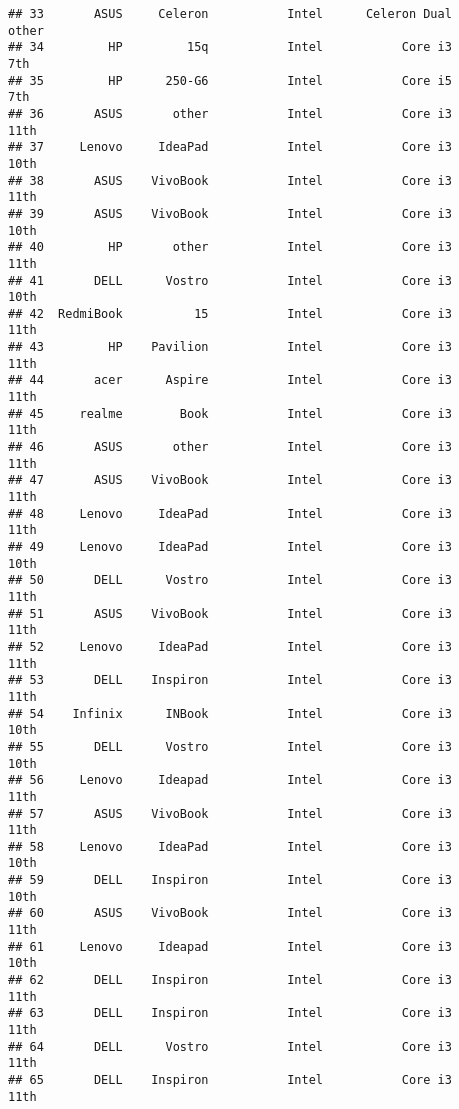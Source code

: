 \documentclass[
]{article}
\begin{document}
\begin{verbatim}
## 33       ASUS     Celeron           Intel      Celeron Dual           other
## 34         HP         15q           Intel           Core i3             7th
## 35         HP      250-G6           Intel           Core i5             7th
## 36       ASUS       other           Intel           Core i3            11th
## 37     Lenovo     IdeaPad           Intel           Core i3            10th
## 38       ASUS    VivoBook           Intel           Core i3            11th
## 39       ASUS    VivoBook           Intel           Core i3            10th
## 40         HP       other           Intel           Core i3            11th
## 41       DELL      Vostro           Intel           Core i3            10th
## 42  RedmiBook          15           Intel           Core i3            11th
## 43         HP    Pavilion           Intel           Core i3            11th
## 44       acer      Aspire           Intel           Core i3            11th
## 45     realme        Book           Intel           Core i3            11th
## 46       ASUS       other           Intel           Core i3            11th
## 47       ASUS    VivoBook           Intel           Core i3            11th
## 48     Lenovo     IdeaPad           Intel           Core i3            11th
## 49     Lenovo     IdeaPad           Intel           Core i3            10th
## 50       DELL      Vostro           Intel           Core i3            11th
## 51       ASUS    VivoBook           Intel           Core i3            11th
## 52     Lenovo     IdeaPad           Intel           Core i3            11th
## 53       DELL    Inspiron           Intel           Core i3            11th
## 54    Infinix      INBook           Intel           Core i3            10th
## 55       DELL      Vostro           Intel           Core i3            10th
## 56     Lenovo     Ideapad           Intel           Core i3            11th
## 57       ASUS    VivoBook           Intel           Core i3            11th
## 58     Lenovo     IdeaPad           Intel           Core i3            10th
## 59       DELL    Inspiron           Intel           Core i3            10th
## 60       ASUS    VivoBook           Intel           Core i3            11th
## 61     Lenovo     Ideapad           Intel           Core i3            10th
## 62       DELL    Inspiron           Intel           Core i3            11th
## 63       DELL    Inspiron           Intel           Core i3            11th
## 64       DELL      Vostro           Intel           Core i3            11th
## 65       DELL    Inspiron           Intel           Core i3            11th

\end{verbatim}
\end{document}
